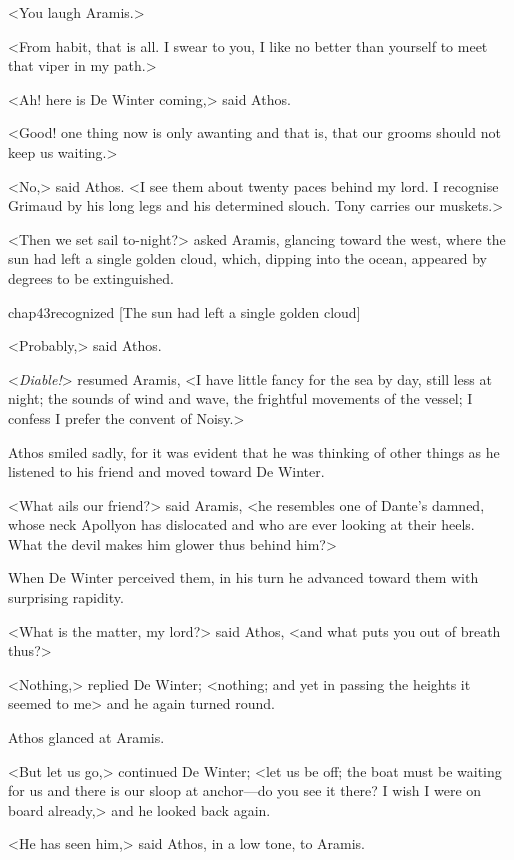 <You laugh Aramis.>

<From habit, that is all. I swear to you, I like no better than yourself to meet that viper in my path.>

<Ah! here is De Winter coming,> said Athos.

<Good! one thing now is only awanting and that is, that our grooms should not keep us waiting.>

<No,> said Athos. <I see them about twenty paces behind my lord. I recognise Grimaud by his long legs and his determined slouch. Tony carries our muskets.>

<Then we set sail to-night?> asked Aramis, glancing toward the west, where the sun had left a single golden cloud, which, dipping into the ocean, appeared by degrees to be extinguished.

\begin{bwbigpic}
	[\basicscale] 
	{chap43recognized}
	[The sun had left a single golden cloud]
\end{bwbigpic}

<Probably,> said Athos.

<\textit{Diable!}> resumed Aramis, <I have little fancy for the sea by day, still less at night; the sounds of wind and wave, the frightful movements of the vessel; I confess I prefer the convent of Noisy.>

Athos smiled sadly, for it was evident that he was thinking of other things as he listened to his friend and moved toward De Winter.

<What ails our friend?> said Aramis, <he resembles one of Dante's damned, whose neck Apollyon has dislocated and who are ever looking at their heels. What the devil makes him glower thus behind him?>

When De Winter perceived them, in his turn he advanced toward them with surprising rapidity.

<What is the matter, my lord?> said Athos, <and what puts you out of breath thus?>

<Nothing,> replied De Winter; <nothing; and yet in passing the heights it seemed to me\longdash> and he again turned round.

Athos glanced at Aramis.

<But let us go,> continued De Winter; <let us be off; the boat must be waiting for us and there is our sloop at anchor—do you see it there? I wish I were on board already,> and he looked back again.

<He has seen him,> said Athos, in a low tone, to Aramis.

